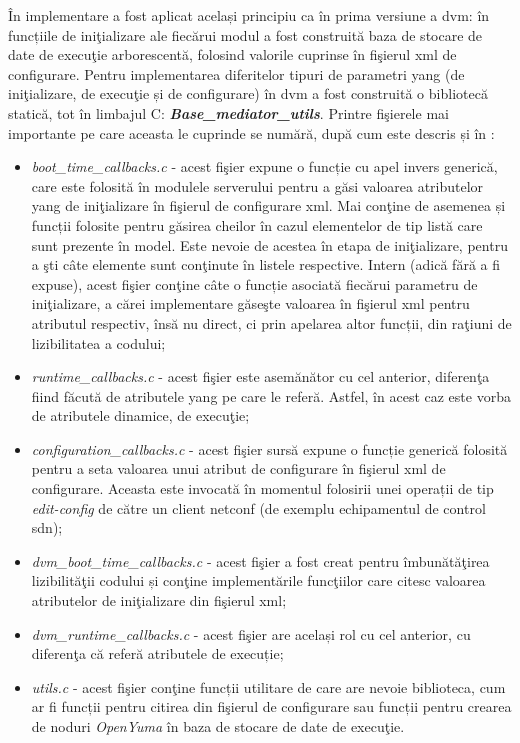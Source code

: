 În implementare a fost aplicat același principiu ca în prima versiune a \gls{dvm}: în funcțiile de iniţializare ale fiecărui modul a fost construită baza de stocare de date de execuţie arborescentă, folosind valorile cuprinse în fişierul \gls{xml} de configurare. Pentru implementarea diferitelor tipuri de parametri \gls{yang} (de iniţializare, de execuţie și de configurare) în \gls{dvm} a fost construită o bibliotecă statică, tot în limbajul C: \textit{\textbf{Base\_mediator\_utils}}. Printre fişierele mai importante pe care aceasta le cuprinde se numără, după cum este descris și în \cite{stancu2017enabling}:
\begin{itemize}
	\item \textit{boot\_time\_callbacks.c} - acest fişier expune o funcție cu apel invers generică, care este folosită în modulele serverului pentru a găsi valoarea atributelor \gls{yang} de iniţializare în fişierul de configurare \gls{xml}. Mai conţine de asemenea și funcții folosite pentru găsirea cheilor în cazul elementelor de tip listă care sunt prezente în model. Este nevoie de acestea în etapa de iniţializare, pentru a şti câte elemente sunt conţinute în listele respective. Intern (adică fără a fi expuse), acest fişier conţine câte o funcție asociată fiecărui parametru de iniţializare, a cărei implementare găseşte valoarea în fişierul \gls{xml} pentru atributul respectiv, însă nu direct, ci prin apelarea altor funcții, din raţiuni de lizibilitatea a codului;
	
	\item \textit{runtime\_callbacks.c} - acest fişier este asemănător cu cel anterior, diferenţa fiind făcută de atributele \gls{yang} pe care le referă. Astfel, în acest caz este vorba de atributele dinamice, de execuţie;
	
	\item \textit{configuration\_callbacks.c} - acest fişier sursă expune o funcție generică folosită pentru a seta valoarea unui atribut de configurare în fişierul \gls{xml} de configurare. Aceasta este invocată în momentul folosirii unei operații de tip \textit{edit-config} de către un client \gls{netconf} (de exemplu echipamentul de control \gls{sdn});
	
	\item \textit{dvm\_boot\_time\_callbacks.c} - acest fişier a fost creat pentru îmbunătăţirea lizibilităţii codului și conţine implementările funcţiilor care citesc valoarea atributelor de iniţializare din fişierul \gls{xml};
	
	\item \textit{dvm\_runtime\_callbacks.c} - acest fişier are același rol cu cel anterior, cu diferenţa că referă atributele de execuție;
	
	\item \textit{utils.c} - acest fişier conţine funcții utilitare de care are nevoie biblioteca, cum ar fi funcții pentru citirea din fişierul de configurare sau funcții pentru crearea de noduri \textit{OpenYuma} în baza de stocare de date de execuţie.
\end{itemize}

